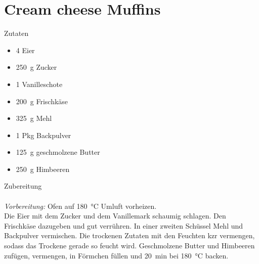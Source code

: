 \section*{Cream cheese Muffins}
\ihead{}\ohead{}
\cfoot{}
{\Large Zutaten}
\begin{multicols}{2}
\begin{itemize}
    \item \num{4} Eier
    \item \SI{250}{g} Zucker
    \item \num{1} Vanilleschote
    \item \SI{200}{g} Frischkäse
    \item \SI{325}{g} Mehl
    \item \num{1} Pkg Backpulver
    \item \SI{125}{g} geschmolzene Butter
    \item \SI{250}{g} Himbeeren
\end{itemize}
\end{multicols}
\noindent
{\Large Zubereitung}\\
\\
\textit{Vorbereitung:} Ofen auf \SI{180}{\celsius} Umluft vorheizen.\\
Die Eier mit dem Zucker und dem Vanillemark schaumig schlagen.
Den Frischkäse dazugeben und gut verrühren.
In einer zweiten Schüssel Mehl und Backpulver vermischen.
Die trockenen Zutaten mit den Feuchten kzr vermengen, sodass das Trockene gerade so feucht wird.
Geschmolzene Butter und Himbeeren zufügen, vermengen, in Förmchen füllen und \SI{20}{min} bei \SI{180}{\celsius} backen.